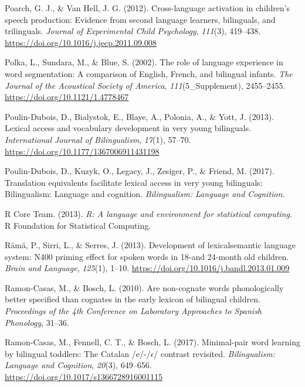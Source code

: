 \documentclass[
  12pt,
  b5paperpaper,
  twoside]{scrreprt}
\newlength{\cslhangindent}
\newlength{\cslentryspacingunit} %
\newenvironment{CSLReferences}[2] %
 {%
  \setlength{\parindent}{0pt}
  \ifodd #1
  \let\oldpar\par
  \def\par{\hangindent=\cslhangindent\oldpar}
  \fi
  \setlength{\parskip}{#2\cslentryspacingunit}
 }%
 {}
\begin{document}
\begin{CSLReferences}{1}{0}
\leavevmode{}%
Poarch, G. J., \& Van Hell, J. G. (2012). Cross-language activation in
children's speech production: Evidence from second language learners,
bilinguals, and trilinguals. \emph{Journal of Experimental Child
Psychology}, \emph{111}(3), 419--438.
\url{https://doi.org/10.1016/j.jecp.2011.09.008}

\leavevmode{}%
Polka, L., Sundara, M., \& Blue, S. (2002). The role of language
experience in word segmentation: A comparison of {English}, {French},
and bilingual infants. \emph{The Journal of the Acoustical Society of
America}, \emph{111}(5\_Supplement), 2455--2455.
\url{https://doi.org/10.1121/1.4778467}

\leavevmode{}%
Poulin-Dubois, D., Bialystok, E., Blaye, A., Polonia, A., \& Yott, J.
(2013). Lexical access and vocabulary development in very young
bilinguals. \emph{International Journal of Bilingualism}, \emph{17}(1),
57--70. \url{https://doi.org/10.1177/1367006911431198}

\leavevmode{}%
Poulin-Dubois, D., Kuzyk, O., Legacy, J., Zesiger, P., \& Friend, M.
(2017). Translation equivalents facilitate lexical access in very young
bilinguals: Bilingualism: Language and cognition. \emph{Bilingualism:
Language and Cognition}.

\leavevmode{}%
R Core Team. (2013). \emph{R: A language and environment for statistical
computing}. R Foundation for Statistical Computing.

\leavevmode{}%
Rämä, P., Sirri, L., \& Serres, J. (2013). Development of
lexical{\textendash}semantic language system: N400 priming effect for
spoken words in 18-and 24-month old children. \emph{Brain and Language},
\emph{125}(1), 1--10. \url{https://doi.org/10.1016/j.bandl.2013.01.009}

\leavevmode{}%
Ramon-Casas, M., \& Bosch, L. (2010). Are non-cognate words
phonologically better specified than cognates in the early lexicon of
bilingual children. \emph{Proceedings of the 4th Conference on
Laboratory Approaches to Spanish Phonology}, 31--36.

\leavevmode{}%
Ramon-Casas, M., Fennell, C. T., \& Bosch, L. (2017). Minimal-pair word
learning by bilingual toddlers: The {Catalan} /e/-/{\(\epsilon\)}/
contrast revisited. \emph{Bilingualism: Language and Cognition},
\emph{20}(3), 649--656. \url{https://doi.org/10.1017/s1366728916001115}


\end{CSLReferences}
\end{document}
